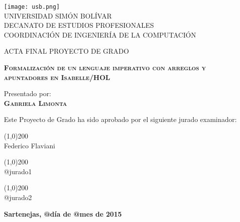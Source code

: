 \begin{titlepage}
\begin{center}

\texttt{[image: usb.png]} \\

\textsc {\large UNIVERSIDAD SIMÓN BOLÍVAR} \\
\textsc{DECANATO DE ESTUDIOS PROFESIONALES\\
COORDINACIÓN DE INGENIERÍA DE LA COMPUTACIÓN}

\bigskip
\bigskip
\bigskip
\bigskip
\bigskip
\bigskip

\textsc{ACTA FINAL PROYECTO DE GRADO}

\bigskip
\bigskip

\textsc{\bfseries Formalización de un lenguaje imperativo con arreglos y apuntadores en Isabelle/HOL}

\bigskip
\bigskip
\bigskip
\bigskip

\begin{minipage}{\textwidth}
\centering
Presentado por: \\
\textsc{\bfseries Gabriela Limonta} \\

\bigskip
\bigskip
\bigskip

Este Proyecto de Grado ha sido aprobado por el siguiente jurado examinador: \\

\bigskip
\bigskip

\line(1,0){200} \\
Federico Flaviani\\

\bigskip
\bigskip

\line(1,0){200} \\
@jurado1\\

\bigskip
\bigskip

\line(1,0){200} \\
@jurado2\\
\end{minipage}

\bigskip
\bigskip
\vfill

{\large \bfseries Sartenejas, @día de @mes de 2015}

\end{center}
\end{titlepage}
